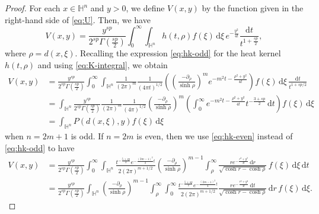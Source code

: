 \documentclass[11pt]{amsart}
\theoremstyle{plain}
\theoremstyle{definition}
\numberwithin{equation}{section}
\begin{document}
\begin{proof}
For each $x \in \mathbb{H}^{n}$ and $y > 0$, we define $V(x,y)$ by the function given in the right-hand side of \eqref{eq:U}. Then, we have
\begin{equation*}
V(x,y) = \frac{y^{sp}}{2^{sp}\Gamma(\frac{sp}{2})} \int_{0}^{\infty} \int_{\mathbb{H}^{n}} h(t, \rho) f(\xi) \,\mathrm{d}\xi \, e^{-\frac{y^{2}}{4t}} \frac{\mathrm{d}t}{t^{1+\frac{sp}{2}}},
\end{equation*}
where $\rho = d(x, \xi)$. Recalling the expression \eqref{eq:hk-odd} for the heat kernel $h(t, \rho)$ and using \eqref{eq:K-integral}, we obtain
\begin{equation*}
\begin{split}
V(x,y)
&= \frac{y^{sp}}{2^{sp}\Gamma(\frac{sp}{2})} \int_{0}^{\infty} \int_{\mathbb{H}^{n}} \frac{1}{(2\pi)^{m}} \frac{1}{(4\pi t)^{1/2}} \left( \left( \frac{-\partial_{\rho}}{\sinh \rho} \right)^{m} e^{-m^{2} t-\frac{\rho^{2}+y^{2}}{4t}} \right) f(\xi) \,\mathrm{d}\xi \, \frac{\mathrm{d}t}{t^{1+sp/2}} \\
&= \int_{\mathbb{H}^{n}} \frac{y^{sp}}{2^{sp}\Gamma(\frac{sp}{2})} \frac{1}{(2\pi)^{m}} \frac{1}{(4\pi)^{1/2}} \left( \frac{-\partial_{\rho}}{\sinh \rho} \right)^{m} \left( \int_{0}^{\infty} e^{-m^{2} t-\frac{\rho^{2}+y^{2}}{4t}} t^{-\frac{3+sp}{2}} \,\mathrm{d}t \right) f(\xi) \,\mathrm{d}\xi \\
&= \int_{\mathbb{H}^{n}} P(d(x,\xi), y) f(\xi) \,\mathrm{d}\xi
\end{split}
\end{equation*}
when $n=2m+1$ is odd. If $n=2m$ is even, then we use \eqref{eq:hk-even} instead of \eqref{eq:hk-odd} to have
\begin{equation*}
\begin{split}
V(x,y)
&= \frac{y^{sp}}{2^{sp}\Gamma(\frac{sp}{2})} \int_{0}^{\infty} \int_{\mathbb{H}^{n}} \frac{t^{-\frac{5+sp}{2}} e^{-\frac{(2m-1)^2}{4}t}}{2(2\pi)^{m+1/2}} \left( \frac{-\partial_{\rho}}{\sinh \rho} \right)^{m-1} \int_{\rho}^{\infty} \frac{r e^{-\frac{r^{2}+y^{2}}{4t}} \,\mathrm{d}r}{\sqrt{\cosh r-\cosh \rho}} \, f(\xi) \,\mathrm{d}\xi \, \mathrm{d}t \\
&= \frac{y^{sp}}{2^{sp}\Gamma(\frac{sp}{2})} \int_{\mathbb{H}^{n}} \left( \frac{-\partial_{\rho}}{\sinh \rho} \right)^{m-1} \int_{\rho}^{\infty} \int_{0}^{\infty} \frac{t^{-\frac{5+sp}{2}} e^{-\frac{(2m-1)^2}{4}t}}{2(2\pi)^{m+1/2}} \frac{r e^{-\frac{r^{2}+y^{2}}{4t}} \,\mathrm{d}t}{\sqrt{\cosh r-\cosh \rho}} \, \mathrm{d}r \,f(\xi) \, \mathrm{d}\xi.
\end{split}

\end{equation*}
\end{proof}
\end{document}
